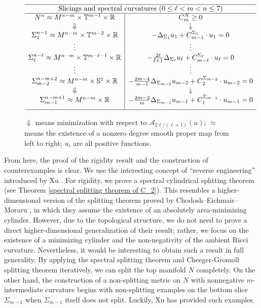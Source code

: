 \documentclass[11pt,letterpaper]{amsart}
\theoremstyle{definition}
\theoremstyle{remark}
\numberwithin{equation}{section}
\begin{document}
 \begin{figure}[htbp]\label{picture of proof}
\centering
\[
\begin{array}{c|c}
\hline
\multicolumn{2}{c}{\text{Slicings and spectral curvatures}\ (0\leq \ell<m<n\leq 7)} \\ \hline 
N^n \approx M^{n-m} \times \mathbb{T}^{m-1} \times \mathbb{R} & C_m^N \geq 0 \\
\Downarrow & \downarrow \\
\Sigma_{1}^{n-1} \approx M^{n-m} \times \mathbb{T}^{m-2} \times \mathbb{R} & -\Delta_{\Sigma_1} u_1 + C_{m-1}^{\Sigma_1} \cdot u_1 = 0 \\
\vdots & \vdots \\
\Sigma_{\ell}^{n-\ell} \approx M^{n-m} \times \mathbb{T}^{m-\ell-1} \times \mathbb{R} & -\frac{2\ell}{\ell+1} \Delta_{\Sigma_\ell} u_\ell + C_{m-\ell}^{\Sigma_\ell} \cdot u_\ell = 0 \\
\vdots & \vdots \\
\Sigma_{m-2}^{n-m+2} \approx M^{n-m} \times \mathbb{S}^1 \times \mathbb{R} & -\frac{2m-4}{m-1} \Delta _{\Sigma_{m-2}} u_{m-2} + C_{2}^{\Sigma_{m-2}} \cdot u_{m-2} = 0 \\
\Downarrow & \downarrow \\
\Sigma_{m-1}^{n-m+1} \approx M^{n-m} \times \mathbb{R} & -\frac{2m-2}{m} \Delta_{\Sigma_{m-1}} u_{m-1} + C_{1}^{\Sigma_{m-1}} \cdot u_{m-1} = 0\\ [7pt]
\hline
\end{array}
\]
\caption{$\Downarrow$  means minimization with respect to $\mathcal{A}_{2\ell/(\ell+1)}(u)$; $\approx$ means the existence of a nonzero degree smooth proper map from left to right; $u_i$ are all positive functions.}

\end{figure}
 
 From here, the proof of the rigidity result and the construction of counterexamples is clear. We use the interesting concept of ``reverse engineering'' introduced by Xu \cite{XuTrans}. For rigidity, we prove a spectral cylindrical splitting theorem (see Theorem \ref{spectral splitting theorem of C_2}). This resembles a higher-dimensional version of the splitting theorem proved by Chodosh--Eichmair--Moraru \cite{chodoshsplittingtheorem}, in which they assume the existence of an absolutely area-minimizing cylinder. However, due to the topological structure, we do not need to prove a direct higher-dimensional generalization of their result; rather, we focus on the existence of a minimizing cylinder and the non-negativity of the ambient Ricci curvature. Nevertheless, it would be interesting to obtain such a result in full generality. By applying the spectral splitting theorem and Cheeger-Gromoll splitting theorem iteratively, we can split the top manifold $N$ completely. On the other hand, the construction of a non-splitting metric on $N$ with nonnegative $m$-intermediate curvature begins with non-splitting examples on the bottom slice $\Sigma_{m-1}$ when $\Sigma_{m-1}$ itself does not split. Luckily, Xu \cite{XuTrans} has provided such examples.
\end{document}

